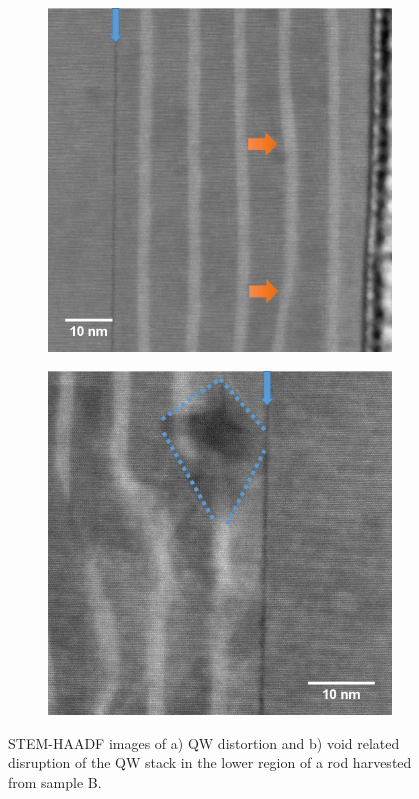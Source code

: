 \begin{figure}[!h]
	\begin{subfigure}[b]{0.45\textwidth}
		\centering
		\includegraphics[width=1\linewidth]{Figs/Ch6/Bstem3}
		\caption{}
		
	\end{subfigure}%
	\hspace*{1.2cm}
	\begin{subfigure}[b]{0.45\textwidth}
		\centering
		\includegraphics[width=1\linewidth]{Figs/Ch6/Bstem5}
		\caption{}
	\end{subfigure}%
	
	\caption{STEM-HAADF images of a) QW distortion and b) void related disruption of the QW stack in the lower region of a rod harvested from sample B.}
	\label{disturbance}
\end{figure}
